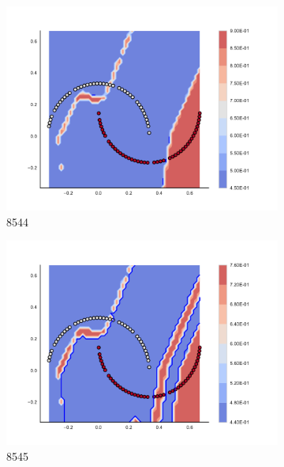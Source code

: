 \begin{figure}[h]
\begin{subfigure}[b]{0.09\textwidth}
    \includegraphics[clip, trim=2.35cm 1.75cm 4.5cm 0cm,width=\textwidth]{img/convergence/8544.pdf}
    \caption{8544}
    \label{fig:convergence_8544}
\end{subfigure}
%
\begin{subfigure}[b]{0.09\textwidth}
    \includegraphics[clip, trim=2.35cm 1.75cm 4.5cm 0cm,width=\textwidth]{img/convergence/8545.pdf}
    \caption{8545}
    \label{fig:convergence_8545}
\end{subfigure}
%
\begin{subfigure}[b]{0.09\textwidth}

\end{subfigure}
\end{figure}
